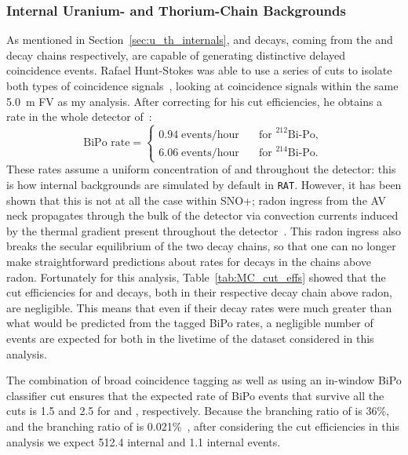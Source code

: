 \subsubsection{Internal Uranium- and Thorium-Chain Backgrounds}
As mentioned in Section~\ref{sec:u_th_internals},  and  decays, coming from the  and  decay chains respectively, are capable of generating distinctive delayed coincidence events. Rafael Hunt-Stokes was able to use a series of cuts to isolate both types of coincidence signals~\cite{hunt-stokesUraniumThoriumBackground2022}, %
looking at coincidence signals within the same \SI{5.0}{\m} FV as my analysis. After correcting for his cut efficiencies, he obtains a rate in the whole detector of~\cite{hunt-stokesPrivateCommunication2023}: %
\begin{equation*}
    \text{BiPo rate} = 
    \begin{cases}
        0.94\; \text{events/hour} & \quad \text{for } ^{212}\text{Bi-Po},\\
        6.06\; \text{events/hour} & \quad \text{for } ^{214}\text{Bi-Po}.
    \end{cases}
\end{equation*}
These rates assume a uniform concentration of  and  throughout the detector: this is how internal backgrounds are simulated by default in \texttt{RAT}. However, it has been shown that this is not at all the case within SNO+; radon ingress from the AV neck propagates through the bulk of the detector via convection currents induced by the thermal gradient present throughout the detector~\cite{wilsonThermallydrivenScintillatorFlow2023}. %
This radon ingress also breaks the secular equilibrium of the two decay chains, so that one can no longer make straightforward predictions about rates for decays in the chains above radon. Fortunately for this analysis, Table~\ref{tab:MC_cut_effs} showed that the cut efficiencies for  and  decays, both in their respective decay chain above radon, are negligible. This means that even if their decay rates were much greater than what would be predicted from the tagged BiPo rates, a negligible number of events are expected for both in the livetime of the dataset considered in this analysis.

The combination of broad coincidence tagging as well as using an in-window BiPo classifier cut ensures that the expected rate of BiPo events that survive all the cuts is 1.5 and 2.5 for  and , respectively. Because the branching ratio of  is 36\%, and the branching ratio of  is 0.021\%~\cite{martinNuclearDataSheets2007,shamsuzzohabasuniaNuclearDataSheets2014}, %
after considering the cut efficiencies in this analysis we expect 512.4 internal  and 1.1 internal  events.

